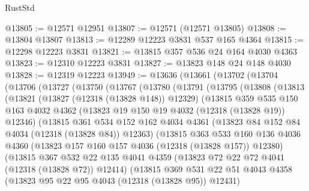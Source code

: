 \begin{lexlean}{RustStd}
\begin{coremodule}
@13805 := @12571 @12951
@13807 := @12571 (@12571 @13805)
@13808 := @13804 @13807
@13813 := @12289 @12223 @3831 @537 @165 @4364
@13815 := @12298 @12223 @3831
@13821 := @13815 @357 @536 @24 @164 @4030 @4363
@13823 := @12310 @12223 @3831
@13827 := @13823 @148 @24 @148 @4030
@13828 := @12319 @12223
@13949 := @13636
    (@13661
      (@13702
        (@13704
          (@13706
            (@13727
              (@13750
                (@13767
                  (@13780
                    (@13791
                      (@13795
                        (@13808
                          (@13813
                            (@13821
                              (@13827 (@12318 (@13828 @148)) @12329)
                              (@13815
                                @359
                                @535
                                @150
                                @163
                                @4032
                                @4362
                                (@13823 @19 @150 @19 @4032 (@12318 (@13828 @19)) @12346)
                                (@13815
                                  @361
                                  @534
                                  @152
                                  @162
                                  @4034
                                  @4361
                                  (@13823 @84 @152 @84 @4034 (@12318 (@13828 @84)) @12363)
                                  (@13815
                                    @363
                                    @533
                                    @160
                                    @136
                                    @4036
                                    @4360
                                    (@13823 @157 @160 @157 @4036 (@12318 (@13828 @157)) @12380)
                                    (@13815
                                      @367
                                      @532
                                      @22
                                      @135
                                      @4041
                                      @4359
                                      (@13823 @72 @22 @72 @4041 (@12318 (@13828 @72)) @12414)
                                      (@13815
                                        @369
                                        @531
                                        @22
                                        @51
                                        @4043
                                        @4358
                                        (@13823 @95 @22 @95 @4043 (@12318 (@13828 @95)) @12431)

\end{coremodule}
\end{lexlean}
